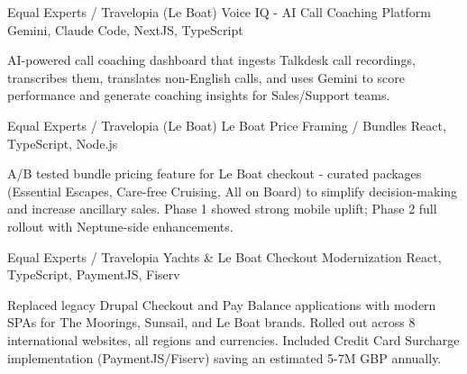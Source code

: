 

\begin{cventries}

	\cventry
	{Equal Experts / Travelopia (Le Boat)} %
	{Voice IQ - AI Call Coaching Platform} %
	{} %
	{Gemini, Claude Code, NextJS, TypeScript} %
	{
		\begin{cvitems}
			\item[] AI-powered call coaching dashboard that ingests Talkdesk call recordings, transcribes them, translates non-English calls, and uses Gemini to score performance and generate coaching insights for Sales/Support teams.
		\end{cvitems}
	}

	\cventry
	{Equal Experts / Travelopia (Le Boat)} %
	{Le Boat Price Framing / Bundles} %
	{} %
	{React, TypeScript, Node.js} %
	{
		\begin{cvitems}
			\item[] A/B tested bundle pricing feature for Le Boat checkout - curated packages (Essential Escapes, Care-free Cruising, All on Board) to simplify decision-making and increase ancillary sales. Phase 1 showed strong mobile uplift; Phase 2 full rollout with Neptune-side enhancements.
		\end{cvitems}
	}

	\cventry
	{Equal Experts / Travelopia} %
	{Yachts \& Le Boat Checkout Modernization} %
	{} %
	{React, TypeScript, PaymentJS, Fiserv} %
	{
		\begin{cvitems}
			\item[] Replaced legacy Drupal Checkout and Pay Balance applications with modern SPAs for The Moorings, Sunsail, and Le Boat brands. Rolled out across 8 international websites, all regions and currencies. Included Credit Card Surcharge implementation (PaymentJS/Fiserv) saving an estimated 5-7M GBP annually.
		\end{cvitems}
	}


\end{cventries}
